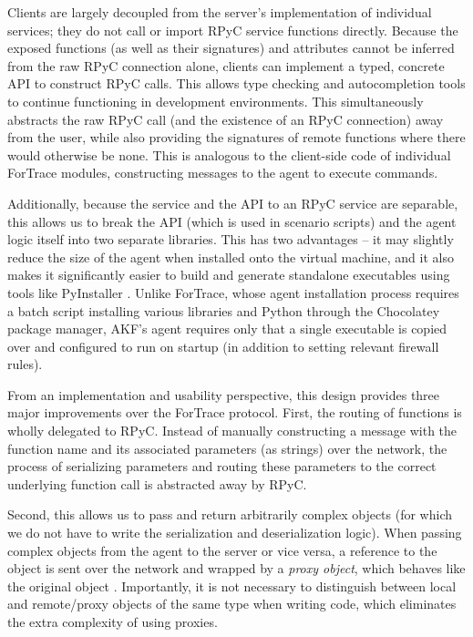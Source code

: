 \documentclass[letterpaper,12pt]{report}
\begin{document}
Clients are largely decoupled from the server's implementation of
individual services; they do not call or import RPyC service functions
directly. Because the exposed functions (as well as their signatures)
and attributes cannot be inferred from the raw RPyC connection alone,
clients can implement a typed, concrete API to construct RPyC calls.
This allows type checking and autocompletion tools to continue
functioning in development environments. This simultaneously abstracts
the raw RPyC call (and the existence of an RPyC connection) away from
the user, while also providing the signatures of remote functions where
there would otherwise be none. This is analogous to the client-side code
of individual ForTrace modules, constructing messages to the agent to
execute commands.

Additionally, because the service and the API to an RPyC service are
separable, this allows us to break the API (which is used in scenario
scripts) and the agent logic itself into two separate libraries. This
has two advantages -- it may slightly reduce the size of the agent when
installed onto the virtual machine, and it also makes it significantly
easier to build and generate standalone executables using tools like
PyInstaller \cite{PyinstallerPyinstaller2025}. Unlike ForTrace,
whose agent installation process requires a batch script installing
various libraries and Python through the Chocolatey package manager,
AKF's agent requires only that a single executable is copied over and
configured to run on startup (in addition to setting relevant firewall
rules).

From an implementation and usability perspective, this design provides
three major improvements over the ForTrace protocol. First, the routing
of functions is wholly delegated to RPyC. Instead of manually
constructing a message with the function name and its associated
parameters (as strings) over the network, the process of serializing
parameters and routing these parameters to the correct underlying
function call is abstracted away by RPyC.

Second, this allows us to pass and return arbitrarily complex objects
(for which we do not have to write the serialization and deserialization
logic). When passing complex objects from the agent to the server or
vice versa, a reference to the object is sent over the network and
wrapped by a \emph{proxy object}, which behaves like the original object
\cite{TheoryOperationRPyC}. Importantly, it is not necessary to
distinguish between local and remote/proxy objects of the same type when
writing code, which eliminates the extra complexity of using proxies.
\end{document}
